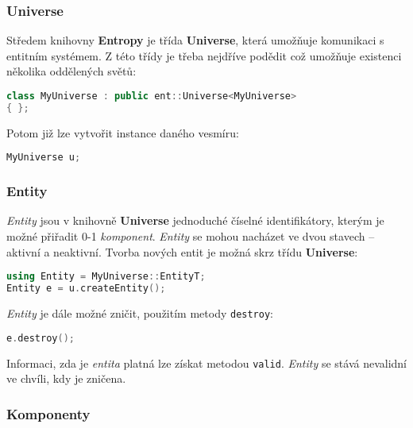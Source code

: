 \subsubsection*{Universe}

Středem knihovny \textbf{Entropy} je třída \textbf{Universe}, která umožňuje komunikaci s entitním systémem. Z této třídy je třeba nejdříve podědit což umožňuje existenci několika oddělených světů:

\begin{lstlisting}[backgroundcolor = \color{lightgray}, language = C++, xleftmargin = 2cm, framexleftmargin = 1em, tabsize=4]
class MyUniverse : public ent::Universe<MyUniverse>
{ };
\end{lstlisting}

\noindent Potom již lze vytvořit instance daného vesmíru:

\begin{lstlisting}[backgroundcolor = \color{lightgray}, language = C++, xleftmargin = 2cm, framexleftmargin = 1em, tabsize=4]
MyUniverse u;
\end{lstlisting}

\subsubsection*{Entity}

\emph{Entity} jsou v knihovně \textbf{Universe} jednoduché číselné identifikátory, kterým je možné přiřadit 0-1 \emph{komponent}. \emph{Entity} se mohou nacházet ve dvou stavech -- aktivní a neaktivní. Tvorba nových entit je možná skrz třídu \textbf{Universe}:

\begin{lstlisting}[backgroundcolor = \color{lightgray}, language = C++, xleftmargin = 2cm, framexleftmargin = 1em, tabsize=4]
using Entity = MyUniverse::EntityT;
Entity e = u.createEntity();
\end{lstlisting}

\noindent \emph{Entity} je dále možné zničit, použitím metody \texttt{destroy}:
\begin{lstlisting}[backgroundcolor = \color{lightgray}, language = C++, xleftmargin = 2cm, framexleftmargin = 1em, tabsize=4]
e.destroy();
\end{lstlisting}

\noindent Informaci, zda je \emph{entita} platná lze získat metodou \texttt{valid}. \emph{Entity} se stává nevalidní ve chvíli, kdy je zničena.

\subsubsection*{Komponenty}

